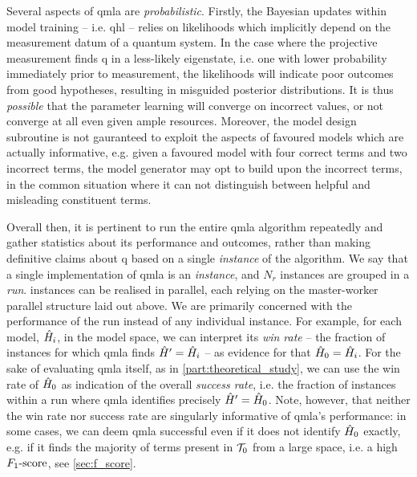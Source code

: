 Several aspects of \gls{qmla} are \emph{probabilistic}.
Firstly, the Bayesian updates within model training -- i.e. \gls{qhl} --
    relies on \glspl{likelihood} which 
    implicitly depend on the measurement datum of a quantum system.
In the case where the projective measurement finds \gls{q} in a less-likely eigenstate, 
    i.e. one with lower probability immediately prior to measurement, 
    the \glspl{likelihood}  will indicate poor outcomes from good hypotheses, 
    resulting in misguided posterior distributions. 
It is thus \emph{possible} that the parameter learning will converge on incorrect values,
    or not converge at all even given ample resources. 
Moreover, the model design subroutine is not gauranteed to exploit the aspects of favoured models which are 
    actually informative, e.g. given a favoured model with four correct terms and two incorrect terms, 
    the model generator may opt to build upon the incorrect terms, in the common situation where it can not distinguish between 
    helpful and misleading constituent terms.
\par 

Overall then, 
    it is pertinent to run the entire \gls{qmla} algorithm repeatedly and gather statistics about its performance and outcomes, 
    rather than making definitive claims about \gls{q} based on a single \emph{instance} of the algorithm. 
We say that a single implementation of \gls{qmla} is an \emph{\gls{instance}},
    and $N_r$ \glspl{instance} are grouped in a \emph{\gls{run}}.
\Glspl{instance} can be realised in parallel, 
    each relying on the master-worker parallel structure laid out above. 
We are primarily concerned with the performance of the \gls{run} 
    instead of any individual instance. 
For example,
    for each model, $\hat{H}_i$, in the \gls{model space}, we can interpret its \emph{ \gls{win rate} } 
    -- the fraction of instances for which \gls{qmla} finds $\hat{H}^{\prime}=\hat{H}_i$ -- 
    as evidence for that $\hat{H}_0=\hat{H}_i$.
For the sake of evaluating \gls{qmla} itself, as in \cref{part:theoretical_study}, 
    we can use the  \gls{win rate}  of $\hat{H}_0$ as indication of the overall \emph{\gls{success rate}}, 
    i.e. the fraction of \glspl{instance} within a run where \gls{qmla} identifies precisely $\hat{H}^{\prime} = \hat{H}_0$. 
Note, however, that neither the  \gls{win rate}  nor \gls{success rate} are singularly informative 
    of \gls{qmla}'s performance: in some cases, we can deem \gls{qmla} successful even if it does not 
    identify $\hat{H}_0$ exactly, e.g. if it finds the majority of terms present in $\mathcal{T}_0$ from a large space, 
    i.e. a high $ F_{1}\text{-score} $, see \cref{sec:f_score}. 
\par 

